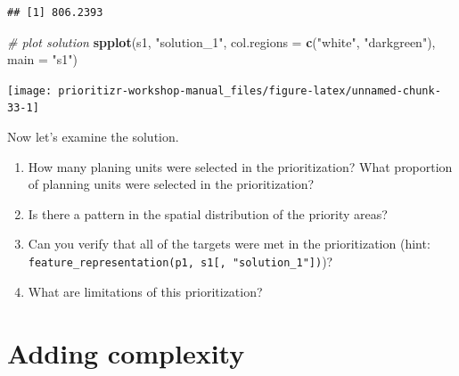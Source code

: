 \documentclass[12pt,]{book}
\newenvironment{Shaded}{\begin{snugshade}}{\end{snugshade}}
\newcommand{\KeywordTok}[1]{\textcolor[rgb]{0.13,0.29,0.53}{\textbf{#1}}}
\newcommand{\DataTypeTok}[1]{\textcolor[rgb]{0.13,0.29,0.53}{#1}}
\newcommand{\DecValTok}[1]{\textcolor[rgb]{0.00,0.00,0.81}{#1}}
\newcommand{\StringTok}[1]{\textcolor[rgb]{0.31,0.60,0.02}{#1}}
\newcommand{\CommentTok}[1]{\textcolor[rgb]{0.56,0.35,0.01}{\textit{#1}}}
\newcommand{\OperatorTok}[1]{\textcolor[rgb]{0.81,0.36,0.00}{\textbf{#1}}}
\newcommand{\NormalTok}[1]{#1}
\providecommand{\tightlist}{%
  \setlength{\itemsep}{0pt}\setlength{\parskip}{0pt}}
\let\BeginKnitrBlock\begin \let\EndKnitrBlock\end
\begin{document}
\begin{Shaded}
\end{Shaded}

\begin{verbatim}
## [1] 806.2393
\end{verbatim}

\begin{Shaded}
\begin{Highlighting}[]
\CommentTok{# plot solution}
\KeywordTok{spplot}\NormalTok{(s1, }\StringTok{"solution_1"}\NormalTok{, }\DataTypeTok{col.regions =} \KeywordTok{c}\NormalTok{(}\StringTok{"white"}\NormalTok{, }\StringTok{"darkgreen"}\NormalTok{), }\DataTypeTok{main =} \StringTok{"s1"}\NormalTok{)}
\end{Highlighting}
\end{Shaded}

\begin{center}\texttt{[image: prioritizr-workshop-manual\_files/figure-latex/unnamed-chunk-33-1]} \end{center}

Now let's examine the solution.

\BeginKnitrBlock{rmdquestion}
\begin{enumerate}
\def\labelenumi{\arabic{enumi}.}
\tightlist
\item
  How many planing units were selected in the prioritization? What
  proportion of planning units were selected in the prioritization?
\item
  Is there a pattern in the spatial distribution of the priority areas?
\item
  Can you verify that all of the targets were met in the prioritization
  (hint:
  \texttt{feature\_representation(p1,\ s1{[},\ "solution\_1"{]})})?
\item
  What are limitations of this prioritization?
\end{enumerate}
\EndKnitrBlock{rmdquestion}

\section{Adding complexity}\label{adding-complexity}
\end{document}

